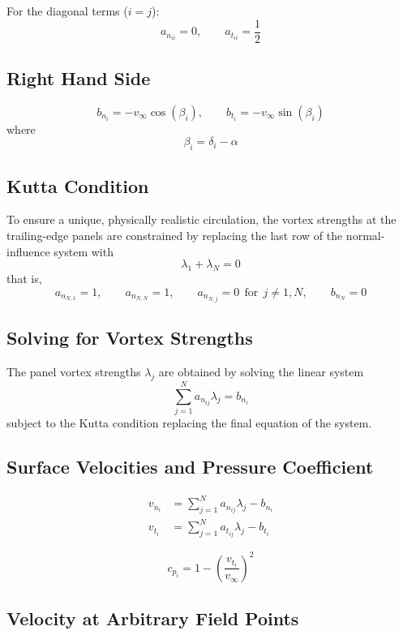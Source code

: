 For the diagonal terms ($i = j$):
\[
a_{n_{ii}} = 0, \qquad a_{t_{ii}} = \frac{1}{2}
\]

\subsection{Right Hand Side}
\label{subsec:right-hand-side}

\[
b_{n_i} = -v_\infty \cos(\beta_i), \qquad b_{t_i} = -v_\infty \sin(\beta_i)
\]
where
\[
\beta_i = \delta_i - \alpha
\]

\subsection{Kutta Condition}
\label{subsec:kutta-condition}

To ensure a unique, physically realistic circulation, the vortex strengths at the trailing-edge panels are constrained
by replacing the last row of the normal-influence system with
\[
\lambda_1 + \lambda_N = 0
\]
that is,
\[
a_{n_{N,1}} = 1, \qquad a_{n_{N,N}} = 1, \qquad a_{n_{N,j}} = 0 \ \ \text{for} \ \ j \neq 1, N, \qquad b_{n_N} = 0
\]

\subsection{Solving for Vortex Strengths}
\label{subsec:solving-for-vortex-strengths}

The panel vortex strengths $\lambda_j$ are obtained by solving the linear system
\[
\sum_{j=1}^{N} a_{n_{ij}} \lambda_j = b_{n_i}
\]
subject to the Kutta condition replacing the final equation of the system.

\subsection{Surface Velocities and Pressure Coefficient}
\label{subsec:surface-velocities-and-pressure-coefficient}

\begin{align*}
v_{n_i} &= \sum_{j=1}^{N} a_{n_{ij}} \lambda_j - b_{n_i} \\
v_{t_i} &= \sum_{j=1}^{N} a_{t_{ij}} \lambda_j - b_{t_i}
\end{align*}

\[
c_{p_i} = 1 - \left(\frac{v_{t_i}}{v_\infty}\right)^2
\]

\subsection{Velocity at Arbitrary Field Points}
\label{subsec:velocity-at-arbitrary-field-points}

